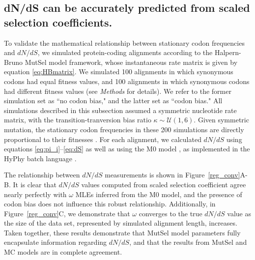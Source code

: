 \documentclass{pnastwo}
\begin{document}
\begin{article}
\subsection*{dN/dS can be accurately predicted from scaled selection coefficients.}

To validate the mathematical relationship between stationary codon frequencies and $dN/dS$, we simulated protein-coding alignments according to the Halpern-Bruno \cite{HalpernBruno1998} MutSel model framework, whose instantaneous rate matrix is given by equation \eqref{eq:HBmatrix}. We simulated 100 alignments in which synonymous codons had equal fitness values, and 100 alignments in which synonymous codons had different fitness values (see \textit{Methods} for details). We refer to the former simulation set as ``no codon bias," and the latter set as ``codon bias." All simulations described in this subsection assumed  a symmetric nucleotide rate matrix, with the transition-tranversion bias ratio $\kappa \sim \mathcal{U}(1,6)$. Given symmetric mutation, the stationary codon frequencies in these 200 simulations are directly proportional to their fitnesses \cite{SellaHirsh2005}. For each alignment, we calculated $dN/dS$ using equations \eqref{eq:pi_i}--\eqref{eq:dS} as well as using the M0 model \cite{NielsenYang1998}, as implemented in the HyPhy batch language \cite{KosakovskyPondetal2005}.

The relationship between $dN/dS$ measurements is shown in Figure~\ref{reg_conv}A-B. It is clear that $dN/dS$ values computed from scaled selection coefficient agree nearly perfectly with $\omega$ MLEs inferred from the M0 model, and the presence of codon bias does not influence this robust relationship. Additionally, in Figure~\ref{reg_conv}C, we demonstrate that $\omega$ converges to the true $dN/dS$ value as the size of the data set, represented by simulated alignment length, increases. Taken together, these results demonstrate that MutSel model parameters fully encapsulate information regarding $dN/dS$, and that the results from MutSel and MC models are in complete agreement.


\end{article}
\end{document}
